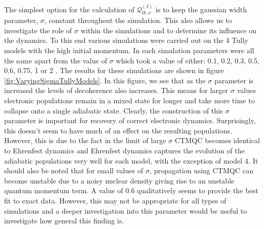 \noindent The simplest option for the calculation of $\mathcal{Q}_{lk, \nu}^{(I)}$ is to keep the gaussian width parameter, $\sigma$, constant throughout the simulation. This also allows us to investigate the role of $\sigma$ within the simulations and to determine its influence on the dynamics. To this end various simulations were carried out on the 4 Tully models with the high initial momentum. In each simulation parameters were all the same apart from the value of $\sigma$ which took a value of either: 0.1, 0.2, 0.3, 0.5, 0.6, 0.75, 1 or 2 . The results for these simulations are shown in figure \ref{fig:VaryingSigmaTullyModels}. In this figure, we see that as the $\sigma$ parameter is increased the levels of decoherence also increases. This means for larger $\sigma$ values electronic populations remain in a mixed state for longer and take more time to collapse onto a single adiabatic state. Clearly, the construction of this $\sigma$ parameter is important for recovery of correct electronic dynamics. Surprisingly, this doesn't seem to have much of an effect on the resulting populations. However, this is due to the fact in the limit of large $\sigma$ CTMQC becomes identical to Ehrenfest dynamics and Ehrenfest dynamics captures the evolution of the adiabatic populations very well for each model, with the exception of model 4. It should also be noted that for small values of $\sigma$, propagation using CTMQC can become unstable due to a noisy nuclear density giving rise to an unstable quantum momentum term. A value of 0.6  qualitatively seems to provide the best fit to exact data. However, this may not be appropriate for all types of simulations and a deeper investigation into this parameter would be useful to investigate how general this finding is.

